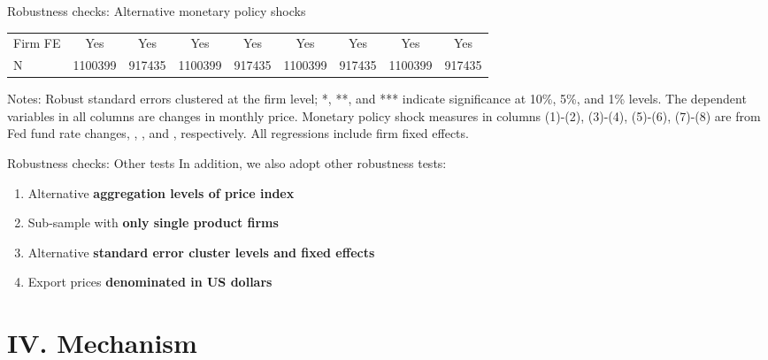 \documentclass[10pt]{beamer}
\begin{document}
\begin{frame}{Robustness checks: Alternative monetary policy shocks}
\begin{table}[htbp]
{\begin{threeparttable}
\begin{tabular}{lcccccccc}
            \midrule
            Firm FE & Yes   & Yes   & Yes   & Yes   & Yes   & Yes   & Yes   & Yes \\
            N     & 1100399 & 917435 & 1100399 & 917435 & 1100399 & 917435 & 1100399 & 917435 \\
            \bottomrule
        \end{tabular}
            \begin{tablenotes}
                \footnotesize
                \item Notes: Robust standard errors clustered at the firm level;  *, **, and *** indicate significance at 10\%, 5\%, and 1\% levels. The dependent variables in all columns are changes in monthly price. Monetary policy shock measures in columns (1)-(2), (3)-(4), (5)-(6), (7)-(8) are from Fed fund rate changes, \cite{nakamura2018high}, \cite{acosta2022perceived}, and \cite{jarocinski2020deconstructing}, respectively. All regressions include firm fixed effects.
    	\end{tablenotes}
        \end{threeparttable}
        }
        \label{tab.altmps}
    \end{table}
\end{frame}

\begin{frame}[label=robustness_other]{Robustness checks: Other tests}
    In addition, we also adopt other robustness tests:
    \medskip
    \begin{enumerate}
        \item Alternative \textbf{aggregation levels of price index} \hyperlink{appendix_tab.altagg}{}
        \item Sub-sample with \textbf{only single product firms} \hyperlink{appendix_tab.single}{}
        \item Alternative \textbf{standard error cluster levels and fixed effects} \hyperlink{appendix_tab.altfe}{}
        \item Export prices \textbf{denominated in US dollars} \hyperlink{appendix_tab.USD}{}
    \end{enumerate}
\end{frame}


\section{IV. Mechanism}
\end{document}
